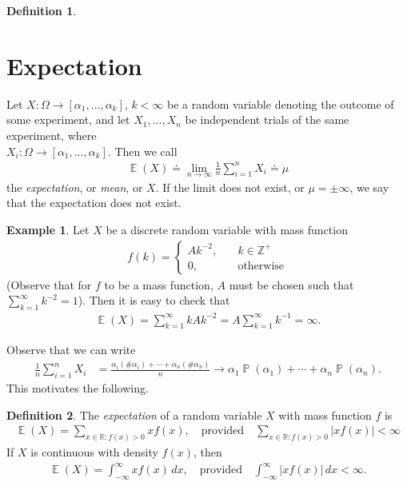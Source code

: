 \documentclass[12pt]{article}
\newcommand{\rr}{\mathbb{R}}
\newcommand{\zz}{\mathbb{Z}}
\DeclareMathOperator{\ex}{\mathbb{E}}
\DeclareMathOperator{\prob}{\mathbb{P}}
\theoremstyle{plain}
\theoremstyle{definition}
\newtheorem*{definition}{Definition}
\newtheorem*{example}{Example}
\theoremstyle{remark}
\numberwithin{equation}{section}  %
\begin{document}
\begin{definition}
	\section{Expectation}
	Let $X: \Omega \to [\alpha_1, \ldots, \alpha_k]$, $k < \infty$ be a random
	variable denoting the outcome of some experiment, and let $X_1, \ldots, 
	X_n$ be independent trials
	of the same experiment, where \\ $X_i:
	\Omega \to [\alpha_1, \ldots, \alpha_k]$. Then we 
	call
	\begin{align*}
		\ex(X) \doteq \lim_{n \to \infty} \frac{1}{n} \sum_{i =1}^n X_i \doteq 
		\mu 
	\end{align*}
	the \emph{expectation}, or \emph{mean}, or $X$. If the limit does not exist,
	or $\mu = \pm \infty$, we say that the expectation does not exist.
\end{definition}
\begin{example}
	Let $X$ be a discrete random variable with mass function 
	\begin{align*}
		f(k) = \begin{cases}
			A k^{-2},  \quad &k\in \zz^{+} 
			\\
			0, \quad & \text{otherwise}
		\end{cases}
	\end{align*}
	(Observe that for $f$ to be a mass function, $A$ must be chosen such that
	$\sum_{k = 1}^{\infty} k^{-2} = 1$).
	Then it is easy to check that
	\begin{align*}
		\ex(X) = \sum_{k=1}^{\infty} k A k^{-2} = A \sum_{k=1}^{\infty} k^{-1} = 
		\infty.
	\end{align*}

\end{example}
Observe that we can write
\begin{align*}
	\frac{1}{n} \sum_{i = 1}^n X_i
	& = \frac{\alpha_i (\#\alpha_i) + \cdots +
	\alpha_n (\#\alpha_n)}{n}
	\to \alpha_1 \prob(\alpha_1) + \cdots + \alpha_n \prob(\alpha_n).
\end{align*}
This motivates the following.
\begin{definition}
	The \emph{expectation} of a random variable $X$ with mass function $f$ is
	\begin{align*}
		\ex(X) = \sum_{x \in \rr: f(x) > 0} x f(x), \quad \text{provided} \quad
		\sum_{x \in \rr: f(x) > 0} |x
		f(x) | <
		\infty
	\end{align*}
	If $X$ is continuous with density $f(x)$, then
	\begin{align*}
		\ex(X) = \int_{-\infty}^{\infty} x f(x) \, dx, \quad \text{provided} \quad
		\int_{-\infty}^{\infty} |x f(x)| \, dx < \infty.
	\end{align*}
\end{definition}
\end{document}
